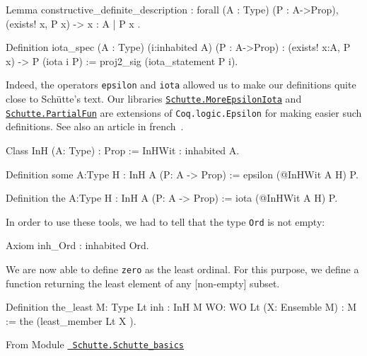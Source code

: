 \begin{Coqsrc}
 Lemma constructive_definite_description :
  forall (A : Type) (P : A->Prop),
    (exists! x, P x) -> { x : A | P x }.
\end{Coqsrc}


\begin{Coqsrc}
Definition iota_spec (A : Type) (i:inhabited A) (P : A->Prop) :
  (exists! x:A, P x) -> P (iota i P)
  := proj2_sig (iota_statement P i).
\end{Coqsrc}



Indeed, the operators \texttt{epsilon} and \texttt{iota} allowed us to make our definitions 
quite close to Schütte's text. Our libraries \href{../theories/html/hydras.Schutte.MoreEpsilonIota.html}%
{\texttt{Schutte.MoreEpsilonIota}}
and
\href{../theories/html/hydras.Schutte.PartialFun.html}%
{\texttt{Schutte.PartialFun}} are extensions of \texttt{Coq.logic.Epsilon} for making easier 
such definitions. See also an article in french~\cite{PCiota}. 



\begin{Coqsrc}
Class InH (A: Type) : Prop :=
   InHWit : inhabited A.

Definition some {A:Type} {H : InH A} (P: A -> Prop) := 
   epsilon (@InHWit A H) P.

Definition the {A:Type} {H : InH A} (P: A -> Prop) := 
   iota (@InHWit A H) P.
\end{Coqsrc}

In order to use these tools,  we had to tell \coq{}  that the type \texttt{Ord} is not empty:

\begin{Coqsrc}
Axiom inh_Ord : inhabited Ord.
\end{Coqsrc}


We are now able to define \texttt{zero} as the least ordinal. For this purpose,
we define a function returning the least element of any [non-empty]  subset.


\begin{Coqsrc}
Definition the_least {M: Type} {Lt}
           {inh : InH M} {WO: WO Lt} (X: Ensemble M)  : M :=
  the  (least_member  Lt X ).
\end{Coqsrc}


\vspace{4pt}

From Module \href{../theories/html/hydras.Schutte.Schutte_basics.html}%
{\texttt{~Schutte.Schutte\_basics}}

